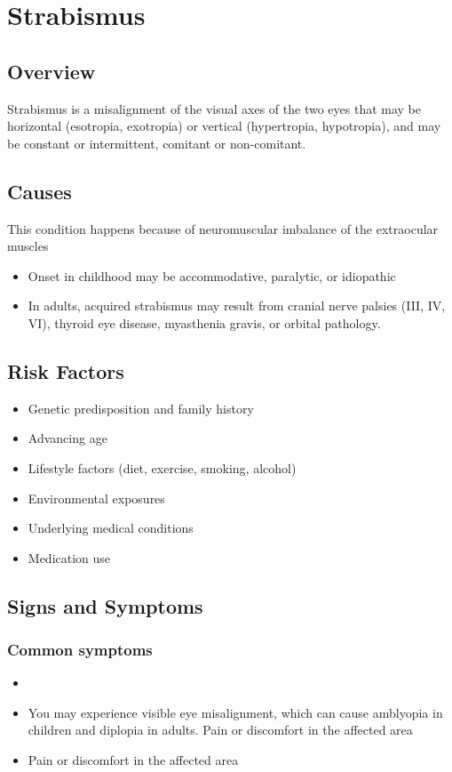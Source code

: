 \chapter{Strabismus}
\label{sec:Strabismus}

\section{Overview}
Strabismus is a misalignment of the visual axes of the two eyes that may be horizontal (esotropia, exotropia) or vertical (hypertropia, hypotropia), and may be constant or intermittent, comitant or non-comitant.
\section{Causes}
This condition happens because of neuromuscular imbalance of the extraocular muscles

\begin{itemize}[noitemsep]
  \item Onset in childhood may be accommodative, paralytic, or idiopathic
  \item In adults, acquired strabismus may result from cranial nerve palsies (III, IV, VI), thyroid eye disease, myasthenia gravis, or orbital pathology.
\end{itemize}
\section{Risk Factors}


\begin{itemize}[noitemsep]
  \item Genetic predisposition and family history
  \item Advancing age
  \item Lifestyle factors (diet, exercise, smoking, alcohol)
  \item Environmental exposures
  \item Underlying medical conditions
  \item Medication use
\end{itemize}
\section{Signs and Symptoms}

\subsection{Common symptoms}
\begin{itemize}[noitemsep]
  \item \item You may experience visible eye misalignment, which can cause amblyopia in children and diplopia in adults. Pain or discomfort in the affected area    \item Pain or discomfort in the affected area
  \end{itemize}

